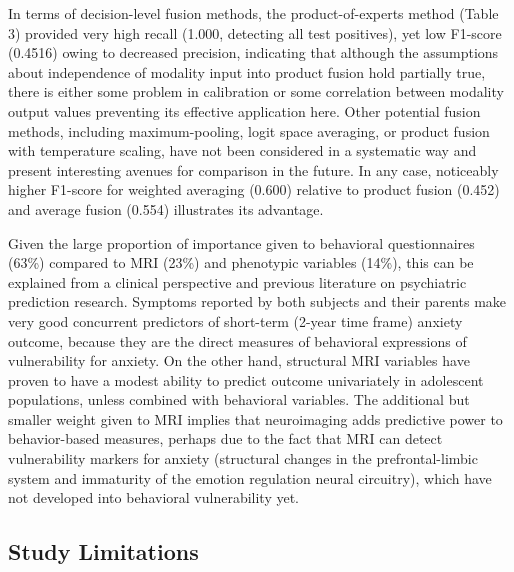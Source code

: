 \documentclass[10pt,letterpaper]{article}
\begin{document}
                                                                                                                                                                          In terms of decision-level fusion methods, the product-of-experts method (Table 3) provided very high recall (1.000, detecting all test positives), yet low F1-score (0.4516) owing to decreased precision, indicating that although the assumptions about independence of modality input into product fusion hold partially true, there is either some problem in calibration or some correlation between modality output values preventing its effective application here. Other potential fusion methods, including maximum-pooling, logit space averaging, or product fusion with temperature scaling, have not been considered in a systematic way and present interesting avenues for comparison in the future. In any case, noticeably higher F1-score for weighted averaging (0.600) relative to product fusion (0.452) and average fusion (0.554) illustrates its advantage.

                                                                                                                                                                         Given the large proportion of importance given to behavioral questionnaires (63\%) compared to MRI (23\%) and phenotypic variables (14\%), this can be explained from a clinical perspective and previous literature on psychiatric prediction research. Symptoms reported by both subjects and their parents make very good concurrent predictors of short-term (2-year time frame) anxiety outcome, because they are the direct measures of behavioral expressions of vulnerability for anxiety. On the other hand, structural MRI variables have proven to have a modest ability to predict outcome univariately in adolescent populations, unless combined with behavioral variables. The additional but smaller weight given to MRI implies that neuroimaging adds predictive power to behavior-based measures, perhaps due to the fact that MRI can detect vulnerability markers for anxiety (structural changes in the prefrontal-limbic system and immaturity of the emotion regulation neural circuitry), which have not developed into behavioral vulnerability yet.
                                                                                                                                                                          \subsection*{Study Limitations}
\end{document}
